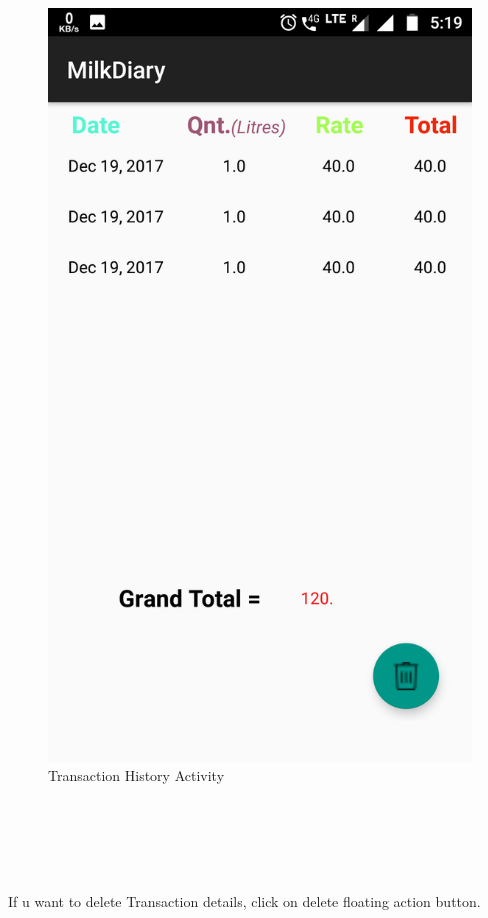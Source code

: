 \begin{figure}[h]
	\centering
	\includegraphics[width=0.7\linewidth]{s10}
	\caption{Transaction History Activity}
\end{figure}
\begin{text}
	\\
	\\
	\\
	\\
\end{text}
If u want to delete Transaction details, click on delete floating action button.
